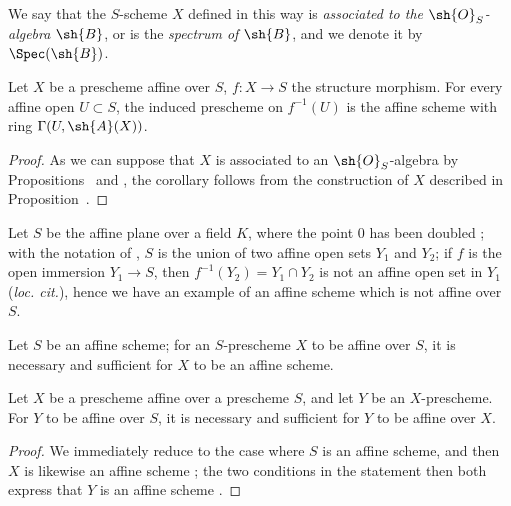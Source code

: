 We say that the $S$-scheme $X$ defined in this way is \emph{associated to the $\sh{O}_S$-algebra $\sh{B}$}, or is the \emph{spectrum of $\sh{B}$}, and we denote it by $\Spec(\sh{B})$.

\begin{corollary}[1.3.2]
\label{II.1.3.2}
Let $X$ be a prescheme affine over $S$, $f:X\to S$ the structure morphism.
For every affine open $U\subset S$, the induced prescheme on $f^{-1}(U)$ is the affine scheme with ring $\Gamma(U,\sh{A}(X))$.
\end{corollary}

\begin{proof}
As we can suppose that $X$ is associated to an $\sh{O}_S$-algebra by Propositions~ and , the corollary follows from the construction of $X$ described in Proposition~.
\end{proof}

\begin{example}[1.3.3]
\label{II.1.3.3}
Let $S$ be the affine plane over a field $K$, where the point $0$ has been doubled ; with the notation of , $S$ is the union of two affine open sets $Y_1$ and $Y_2$; if $f$ is the open immersion $Y_1\to S$, then $f^{-1}(Y_2)=Y_1\cap Y_2$ is not an affine open set in $Y_1$ (\emph{loc. cit.}), hence we have an example of an affine scheme which is not affine over $S$.
\end{example}

\begin{corollary}[1.3.4]
\label{II.1.3.4}
Let $S$ be an affine scheme; for an $S$-prescheme $X$ to be affine over $S$, it is necessary and sufficient for $X$ to be an affine scheme.
\end{corollary}

\begin{corollary}[1.3.5]
\label{II.1.3.5}
Let $X$ be a prescheme affine over a prescheme $S$, and let $Y$ be an $X$-prescheme.
For $Y$ to be affine over $S$, it is necessary and sufficient for $Y$ to be affine over $X$.
\end{corollary}

\begin{proof}
We immediately reduce to the case where $S$ is an affine scheme, and then $X$ is likewise an affine scheme ; the two conditions in the statement then both express that $Y$ is an affine scheme .
\end{proof}

